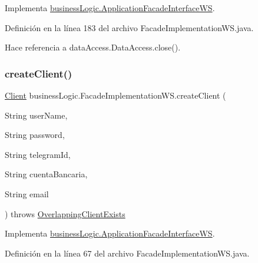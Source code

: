 Implementa \mbox{\hyperlink{interfacebusiness_logic_1_1_application_facade_interface_w_s_a8cbc91e14e6abf2d7577ba2c69f4b48f}{business\+Logic.\+Application\+Facade\+Interface\+WS}}.



Definición en la línea 183 del archivo Facade\+Implementation\+W\+S.\+java.


\begin{DoxyCode}{0}

\end{DoxyCode}


Hace referencia a data\+Access.\+Data\+Access.\+close().

\mbox{\label{classbusiness_logic_1_1_facade_implementation_w_s_a2c5f0e41c6463d8e5c7d4b89ea3f676f}} 
\subsubsection{\texorpdfstring{createClient()}{createClient()}}
{\footnotesize\ttfamily \mbox{\hyperlink{classdomain_1_1_client}{Client}} business\+Logic.\+Facade\+Implementation\+W\+S.\+create\+Client (\begin{DoxyParamCaption}\item[{String}]{user\+Name,  }\item[{String}]{password,  }\item[{String}]{telegram\+Id,  }\item[{String}]{cuenta\+Bancaria,  }\item[{String}]{email }\end{DoxyParamCaption}) throws \mbox{\hyperlink{classexceptions_1_1_overlapping_client_exists}{Overlapping\+Client\+Exists}}}



Implementa \mbox{\hyperlink{interfacebusiness_logic_1_1_application_facade_interface_w_s_ac2cbd39795e0c171a79ac440698bd859}{business\+Logic.\+Application\+Facade\+Interface\+WS}}.



Definición en la línea 67 del archivo Facade\+Implementation\+W\+S.\+java.


